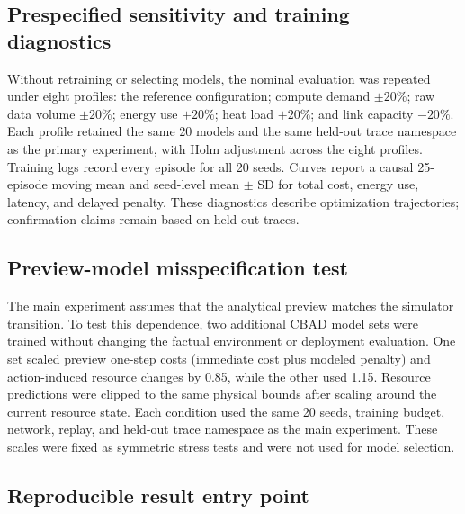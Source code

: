 \documentclass[11pt]{article}
\begin{document}
\subsection{Prespecified sensitivity and training diagnostics}

{\color{red}%
Without retraining or selecting models, the nominal evaluation was repeated under eight profiles: the reference configuration; compute demand $\pm20\%$; raw data volume $\pm20\%$; energy use $+20\%$; heat load $+20\%$; and link capacity $-20\%$. Each profile retained the same 20 models and the same held-out trace namespace as the primary experiment, with Holm adjustment across the eight profiles. Training logs record every episode for all 20 seeds. Curves report a causal 25-episode moving mean and seed-level mean $\pm$ SD for total cost, energy use, latency, and delayed penalty. These diagnostics describe optimization trajectories; confirmation claims remain based on held-out traces.
}%

\subsection{Preview-model misspecification test}

{\color{red}%
The main experiment assumes that the analytical preview matches the simulator transition. To test this dependence, two additional CBAD model sets were trained without changing the factual environment or deployment evaluation. One set scaled preview one-step costs (immediate cost plus modeled penalty) and action-induced resource changes by 0.85, while the other used 1.15. Resource predictions were clipped to the same physical bounds after scaling around the current resource state. Each condition used the same 20 seeds, training budget, network, replay, and held-out trace namespace as the main experiment. These scales were fixed as symmetric stress tests and were not used for model selection.
}%

\subsection{Reproducible result entry point}
\end{document}
